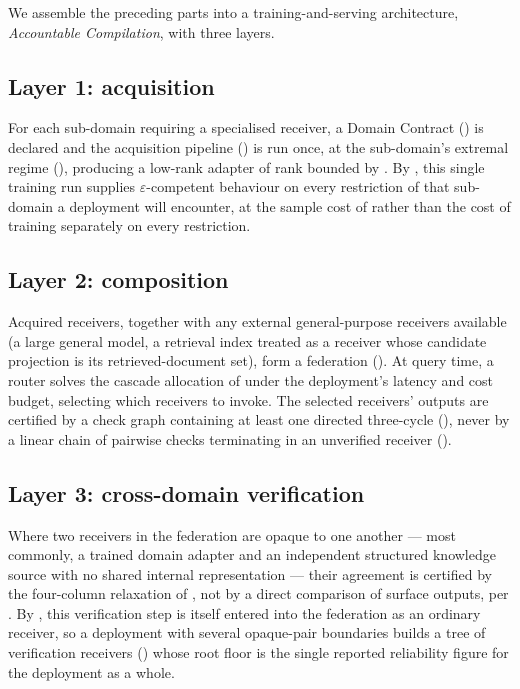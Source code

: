 \documentclass[11pt,twocolumn,a4paper]{article}
\theoremstyle{rdm}
\theoremstyle{definition}
\theoremstyle{remark}
\newcommand{\eps}{\varepsilon}
\begin{document}
We assemble the preceding parts into a training-and-serving architecture,
\emph{Accountable Compilation}, with three layers.

\subsection{Layer 1: acquisition}
For each sub-domain requiring a specialised receiver, a Domain Contract
() is declared and the acquisition pipeline
() is run once, at the sub-domain's extremal regime
(), producing a low-rank adapter of rank bounded by
. By , this single training run supplies
$\eps$-competent behaviour on every restriction of that sub-domain a
deployment will encounter, at the sample cost of 
rather than the cost of training separately on every restriction.

\subsection{Layer 2: composition}
Acquired receivers, together with any external general-purpose receivers
available (a large general model, a retrieval index treated as a receiver
whose candidate projection is its retrieved-document set), form a
federation (). At query time, a router solves the
cascade allocation of  under the deployment's latency and
cost budget, selecting which receivers to invoke. The selected receivers'
outputs are certified by a check graph containing at least one directed
three-cycle (), never by a linear chain of pairwise
checks terminating in an unverified receiver ().

\subsection{Layer 3: cross-domain verification}
Where two receivers in the federation are opaque to one another --- most
commonly, a trained domain adapter and an independent structured knowledge
source with no shared internal representation --- their agreement is
certified by the four-column relaxation of , not by a
direct comparison of surface outputs, per . By
, this verification step is itself entered into the
federation as an ordinary receiver, so a deployment with several
opaque-pair boundaries builds a tree of verification receivers
() whose root floor is the single reported reliability
figure for the deployment as a whole.
\end{document}
